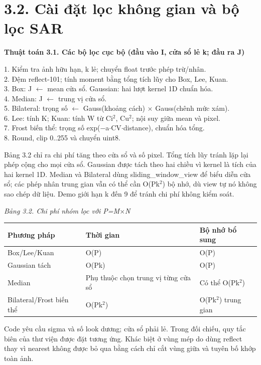 \documentclass[12pt,a4paper]{extreport}
\begin{document}
\section*{3.2. Cài đặt lọc không gian và bộ lọc SAR}
\textbf{Thuật toán 3.1. Các bộ lọc cục bộ (đầu vào I,\allowbreak{} cửa sổ lẻ k; đầu ra J)}\par{\fontsize{10.5}{12}\selectfont\begin{flushleft}
1. Kiểm tra ảnh hữu hạn,\allowbreak{} k lẻ; chuyển float trước phép trừ/\allowbreak{}nhân.\\
2. Đệm reflect-101; tính moment bằng tổng tích lũy cho Box,\allowbreak{} Lee,\allowbreak{} Kuan.\\
3. Box: J \ensuremath{\leftarrow} mean cửa sổ. Gaussian: hai lượt kernel 1D chuẩn hóa.\\
4. Median: J \ensuremath{\leftarrow} trung vị cửa sổ.\\
5. Bilateral: trọng số \ensuremath{\leftarrow} Gauss(khoảng cách) \ensuremath{\times} Gauss(chênh mức xám).\\
6. Lee: tính K; Kuan: tính W từ Ci\ensuremath{{}^2},\allowbreak{} Cu\ensuremath{{}^2}; nội suy giữa mean và pixel.\\
7. Frost biến thể: trọng số exp(\ensuremath{-}a\ensuremath{\cdot}CV\ensuremath{\cdot}distance),\allowbreak{} chuẩn hóa tổng.\\
8. Round,\allowbreak{} clip 0..255 và chuyển uint8.\\
\end{flushleft}}
Bảng 3.2 chỉ ra chi phí tăng theo cửa sổ và số pixel. Tổng tích lũy tránh lặp lại phép cộng cho mọi cửa sổ. Gaussian được tách theo hai chiều vì kernel là tích của hai kernel 1D. Median và Bilateral dùng sliding\_window\_view để biểu diễn cửa sổ; các phép nhân trung gian vẫn có thể cần O(Pk\ensuremath{{}^2}) bộ nhớ,\allowbreak{} dù view tự nó không sao chép dữ liệu. Demo giới hạn k đến 9 để tránh chi phí không kiểm soát.
\par
{\fontsize{10.5}{12}\selectfont\textit{Bảng 3.2. Chi phí nhóm lọc với P=\allowbreak{}M\ensuremath{\times}N}
\begin{longtable}{>{\raggedright\arraybackslash}p{5.035cm}|>{\raggedright\arraybackslash}p{5.035cm}|>{\raggedright\arraybackslash}p{5.035cm}}
\textbf{Phương pháp} & \textbf{Thời gian} & \textbf{Bộ nhớ bổ sung}\\\hline
\endhead
Box/\allowbreak{}Lee/\allowbreak{}Kuan & O(P) & O(P)\\\hline
Gaussian tách & O(Pk) & O(P)\\\hline
Median & Phụ thuộc chọn trung vị từng cửa sổ & Có thể O(Pk\ensuremath{{}^2})\\\hline
Bilateral/\allowbreak{}Frost biến thể & O(Pk\ensuremath{{}^2}) & O(Pk\ensuremath{{}^2}) trung gian\\\hline
\end{longtable}}
Code yêu cầu sigma và số look dương; cửa sổ phải lẻ. Trong đối chiếu,\allowbreak{} quy tắc biên của thư viện được đặt tương ứng. Khác biệt ở vùng mép do dùng reflect thay vì nearest không được bỏ qua bằng cách chỉ cắt vùng giữa và tuyên bố khớp toàn ảnh.
\par
\end{document}
